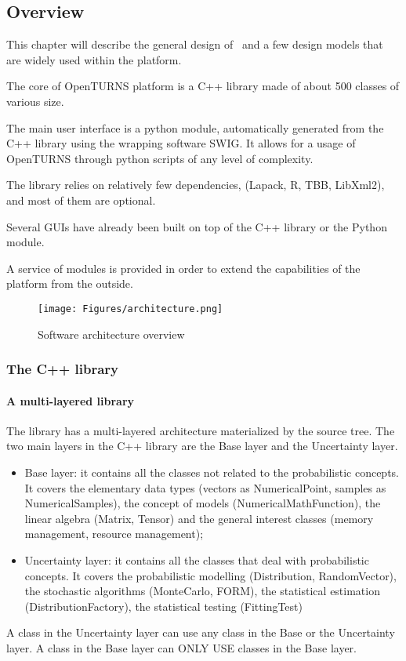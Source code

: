 \subsection{Overview}

This chapter will describe the general design of \OT\, and a few design models that are widely used within the platform.

The core of OpenTURNS platform is a C++ library made of about 500 classes of various size.

The main user interface is a python module, automatically generated from the C++ library using the wrapping software SWIG. It allows for a usage of OpenTURNS through python scripts of any level of complexity.

The library relies on relatively few dependencies, (Lapack, R, TBB, LibXml2), and most of them are optional.

Several GUIs have already been built on top of the C++ library or the Python module.

A service of modules is provided in order to extend the capabilities of the platform from the outside.

\begin{figure}[H]
\begin{center}
\texttt{[image: Figures/architecture.png]}
\caption{Software architecture overview}
\end{center}
\end{figure}

\subsubsection{The C++ library}

\paragraph{A multi-layered library}

The library has a multi-layered architecture materialized by the source tree.
The two main layers in the C++ library are the Base layer and the Uncertainty layer.
\begin{itemize}
\item Base layer: it contains all the classes not related to the probabilistic concepts. It covers the elementary data types (vectors as NumericalPoint, samples as NumericalSamples), the concept of models (NumericalMathFunction), the linear algebra (Matrix, Tensor) and the general interest classes (memory management, resource management);
\item Uncertainty layer: it contains all the classes that deal with probabilistic concepts. It covers the probabilistic modelling (Distribution, RandomVector), the stochastic algorithms (MonteCarlo, FORM), the statistical estimation (DistributionFactory), the statistical testing (FittingTest)
\end{itemize}
A class in the Uncertainty layer can use any class in the Base or the Uncertainty layer. A class in the Base layer can ONLY USE classes in the Base layer.

